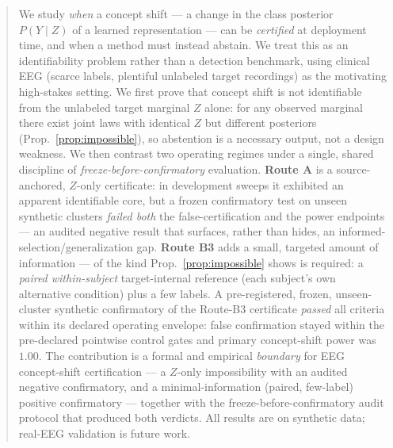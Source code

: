\begin{abstract}
We study \emph{when} a concept shift --- a change in the class posterior $P(Y\mid Z)$ of a learned
representation --- can be \emph{certified} at deployment time, and when a method must instead abstain. We
treat this as an identifiability problem rather than a detection benchmark, using clinical EEG (scarce
labels, plentiful unlabeled target recordings) as the motivating high-stakes setting. We first prove that
concept shift is not identifiable from the unlabeled target marginal $Z$ alone: for any observed marginal
there exist joint laws with identical $Z$ but different posteriors (Prop.~\ref{prop:impossible}), so
abstention is a necessary output, not a design weakness. We then contrast two operating regimes under a
single, shared discipline of \emph{freeze-before-confirmatory} evaluation. \textbf{Route A} is a
source-anchored, $Z$-only certificate: in development sweeps it exhibited an apparent identifiable core,
but a frozen confirmatory test on unseen synthetic clusters \emph{failed both} the false-certification and
the power endpoints --- an audited negative result that surfaces, rather than hides, an
informed-selection/generalization gap. \textbf{Route B3} adds a small, targeted amount of information --- of the kind
Prop.~\ref{prop:impossible} shows is required: a \emph{paired within-subject} target-internal reference (each subject's own
alternative condition) plus a few labels. A pre-registered, frozen, unseen-cluster synthetic confirmatory
of the Route-B3 certificate \emph{passed} all criteria within its declared operating envelope: false
confirmation stayed within the pre-declared pointwise control gates and primary concept-shift power was
$1.00$. The contribution is a formal and empirical \emph{boundary} for EEG concept-shift certification ---
a $Z$-only impossibility with an audited negative confirmatory, and a minimal-information (paired,
few-label) positive confirmatory --- together with the freeze-before-confirmatory audit protocol that
produced both verdicts. All results are on synthetic data; real-EEG validation is future work.
\end{abstract}
